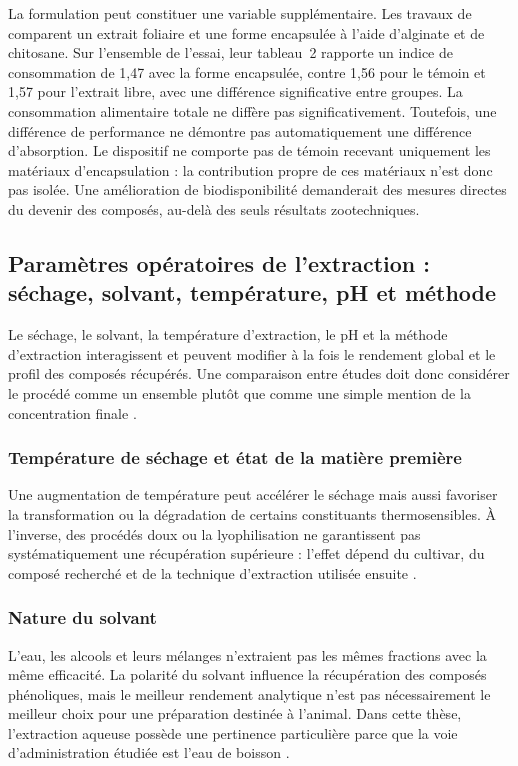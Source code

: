 La formulation peut constituer une variable supplémentaire. Les travaux de \citet{Hiba2026} comparent un extrait foliaire et une forme encapsulée à l'aide d'alginate et de chitosane. Sur l'ensemble de l'essai, leur tableau~2 rapporte un indice de consommation de 1,47 avec la forme encapsulée, contre 1,56 pour le témoin et 1,57 pour l'extrait libre, avec une différence significative entre groupes. La consommation alimentaire totale ne diffère pas significativement. Toutefois, une différence de performance ne démontre pas automatiquement une différence d'absorption. Le dispositif ne comporte pas de témoin recevant uniquement les matériaux d'encapsulation : la contribution propre de ces matériaux n'est donc pas isolée. Une amélioration de biodisponibilité demanderait des mesures directes du devenir des composés, au-delà des seuls résultats zootechniques.

\subsection{Paramètres opératoires de l'extraction : séchage, solvant, température, pH et méthode}

Le séchage, le solvant, la température d'extraction, le pH et la méthode d'extraction interagissent et peuvent modifier à la fois le rendement global et le profil des composés récupérés. Une comparaison entre études doit donc considérer le procédé comme un ensemble plutôt que comme une simple mention de la concentration finale \citep{Debs2023,CorAndrejc2022}.

\subsubsection{Température de séchage et état de la matière première}

Une augmentation de température peut accélérer le séchage mais aussi favoriser la transformation ou la dégradation de certains constituants thermosensibles. À l'inverse, des procédés doux ou la lyophilisation ne garantissent pas systématiquement une récupération supérieure : l'effet dépend du cultivar, du composé recherché et de la technique d'extraction utilisée ensuite \citep{CastilloLuna2023,CorAndrejc2022}.

\subsubsection{Nature du solvant}

L'eau, les alcools et leurs mélanges n'extraient pas les mêmes fractions avec la même efficacité. La polarité du solvant influence la récupération des composés phénoliques, mais le meilleur rendement analytique n'est pas nécessairement le meilleur choix pour une préparation destinée à l'animal. Dans cette thèse, l'extraction aqueuse possède une pertinence particulière parce que la voie d'administration étudiée est l'eau de boisson \citep{Debs2023,Papageorgiou2022}.

